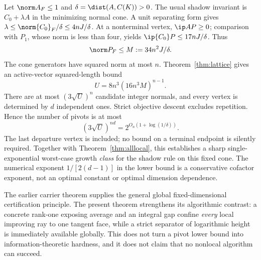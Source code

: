 Let $\norm A_F\le1$ and $\delta=\dist(A,C(K))>0$. The usual shadow invariant is $C_0+\lambda A$ in the minimizing normal cone. A unit separating form gives $\lambda\le\norm{C_0}_F/\delta\le4nJ/\delta$. At a nonterminal vertex, $\ip AP\ge0$; comparison with $P_1$, whose norm is less than four, yields $\ip{C_0}P\le17nJ/\delta$. Thus
\[
 \norm P_F\le M:=34n^2J/\delta.
\]
The cone generators have squared norm at most $n$. Theorem~\ref{thm:lattice} gives an active-vector squared-length bound
\[
 U=8n^3(16n^3M)^{n-1}.
\]
There are at most $(3\sqrt U)^n$ candidate integer normals, and every vertex is determined by $d$ independent ones. Strict objective descent excludes repetition. Hence the number of pivots is at most
\[
 (3\sqrt U)^{nd}=2^{O_n(1+\log(1/\delta))}.
\]
The last departure vertex is included; no bound on a terminal endpoint is silently required. Together with Theorem~\ref{thm:alllocal}, this establishes a sharp single-exponential worst-case growth \emph{class} for the shadow rule on this fixed cone. The numerical exponent $1/[2(d-1)]$ in the lower bound is a conservative cofactor exponent, not an optimal constant or optimal dimension dependence.

The earlier carrier theorem supplies the general global fixed-dimensional certification principle. The present theorem strengthens its algorithmic contrast: a concrete rank-one exposing average and an integral gap confine \emph{every} local improving ray to one tangent face, while a strict separator of logarithmic height is immediately available globally. This does not turn a pivot lower bound into information-theoretic hardness, and it does not claim that no nonlocal algorithm can succeed.
